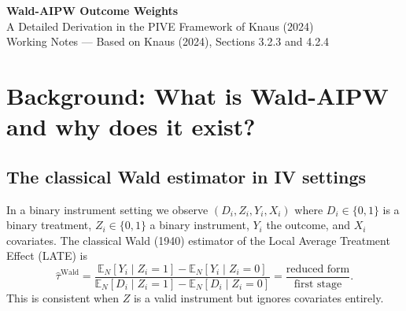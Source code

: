 \documentclass[12pt, a4paper]{article}
\theoremstyle{condstyle}
\theoremstyle{plain}
\newcommand{\EN}{\mathbb{E}_N}
\newcommand{\bone}{\mathbf{1}_N}
\newcommand{\bD}{\mathbf{D}}
\begin{document}

\begin{titlepage}
\centering\vspace*{2cm}
{\LARGE\bfseries Wald-AIPW Outcome Weights}\\[0.5em]
{\large A Detailed Derivation in the PIVE Framework of Knaus (2024)}\\[2cm]
{\normalsize Working Notes --- Based on Knaus (2024), Sections 3.2.3 and 4.2.4}
\vfill
\begin{abstract}
\noindent
These notes work through the Wald-AIPW estimator completely:
what it is, why it is built the way it is, how it maps onto the
Pseudo-IV Estimator (PIVE) framework of Knaus (2024), how the
outcome weights are derived from the transformation matrix, and
which of Knaus's six conditions are required for the weights to
exist and to be normalized.
The main result is that standard implementations are only
\emph{scale-normalized} (weights sum to zero) but not
\emph{fully normalized} (treated weights do not sum to one),
because Condition~5b is not fulfilled in practice.
Every algebraic step is shown explicitly, including the
multiplications by $\bone$ and $\bD$ that Knaus (2024) states
only briefly.
\end{abstract}
\end{titlepage}

\tableofcontents\newpage

\section{Background: What is Wald-AIPW and why does it exist?}
\label{sec:background}

\subsection{The classical Wald estimator in IV settings}

In a binary instrument setting we observe
$(D_i, Z_i, Y_i, X_i)$ where $D_i\in\{0,1\}$ is a binary treatment,
$Z_i\in\{0,1\}$ a binary instrument, $Y_i$ the outcome, and $X_i$ covariates.
The classical Wald (1940) estimator of the Local Average Treatment Effect (LATE) is
\begin{equation}
  \hat\tau^{\mathrm{Wald}}
  = \frac{\EN[Y_i\mid Z_i=1]-\EN[Y_i\mid Z_i=0]}%
         {\EN[D_i\mid Z_i=1]-\EN[D_i\mid Z_i=0]}
  = \frac{\text{reduced form}}{\text{first stage}}.
  \label{eq:wald}
\end{equation}
This is consistent when $Z$ is a valid instrument but ignores covariates entirely.
\end{document}
